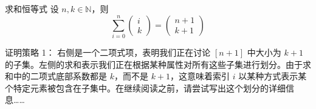 \begin{theorem}{求和恒等式}
    设 $n,k \in \mathbb{N}$，则
    \[\sum_{i=0}^{n} \begin{pmatrix}i\\k\end{pmatrix} = \begin{pmatrix}n+1\\k+1\end{pmatrix}\]
\end{theorem}

\begin{questions}{证明策略 1：}
    右侧是一个二项式项，表明我们正在讨论 $[n+1]$ 中大小为 $k+1$ 的子集。左侧的求和表示我们正在根据某种属性对所有这些子集进行划分。由于求和中的二项式底部系数都是 $k$，而不是 $k+1$，这意味着索引 $i$ 以某种方式表示某个特定元素被包含在子集中。在继续阅读之前，请尝试写出这个划分的详细信息……
\end{questions}


